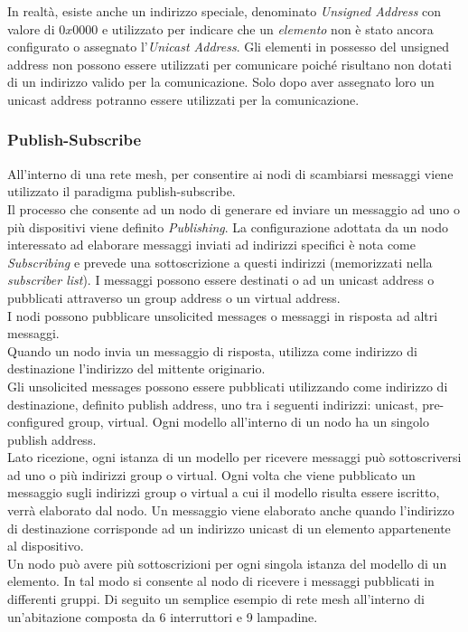 \noindent In realtà, esiste anche un indirizzo speciale, denominato \textit{Unsigned Address} con valore di $0x0000$ e utilizzato per indicare che un \textit{elemento} non è stato ancora configurato o assegnato l'\textit{Unicast Address}. Gli elementi in possesso del unsigned address non possono essere utilizzati per comunicare poiché risultano non dotati di un indirizzo valido per la comunicazione. Solo dopo aver assegnato loro un unicast address potranno essere utilizzati per la comunicazione.

\subsubsection{Publish-Subscribe}
\label{subsub:publish_subscribe}
All'interno di una rete mesh, per consentire ai nodi di scambiarsi messaggi viene utilizzato il paradigma publish-subscribe.\\
Il processo che consente ad un nodo di generare ed inviare un messaggio ad uno o più dispositivi viene definito \textit{Publishing}. La configurazione adottata da un nodo interessato ad elaborare messaggi inviati ad indirizzi specifici è nota come \textit{Subscribing} e prevede una sottoscrizione a questi indirizzi (memorizzati nella \textit{subscriber list}). I messaggi possono essere destinati o ad un unicast address o pubblicati attraverso un group address o un virtual address.\\

\noindent I nodi possono pubblicare unsolicited messages o messaggi in risposta ad altri messaggi.\\
Quando un nodo invia un messaggio di risposta, utilizza come indirizzo di destinazione l'indirizzo del mittente originario.\\
Gli unsolicited messages possono essere pubblicati utilizzando come indirizzo di destinazione, definito publish address, uno tra i seguenti indirizzi: unicast, pre-configured group, virtual. Ogni modello all'interno di un nodo ha un singolo publish address.\\

\noindent Lato ricezione, ogni istanza di un modello per ricevere messaggi può sottoscriversi ad uno o più indirizzi group o virtual. Ogni volta che viene pubblicato un messaggio sugli indirizzi group o virtual a cui il modello risulta essere iscritto, verrà elaborato dal nodo. Un messaggio viene elaborato anche quando l'indirizzo di destinazione corrisponde ad un indirizzo unicast di un elemento appartenente al dispositivo.\\
Un nodo può avere più sottoscrizioni per ogni singola istanza del modello di un elemento. In tal modo si consente al nodo di ricevere i messaggi pubblicati in differenti gruppi. Di seguito un semplice esempio di rete mesh all'interno di un'abitazione composta da 6 interruttori e 9 lampadine. 

